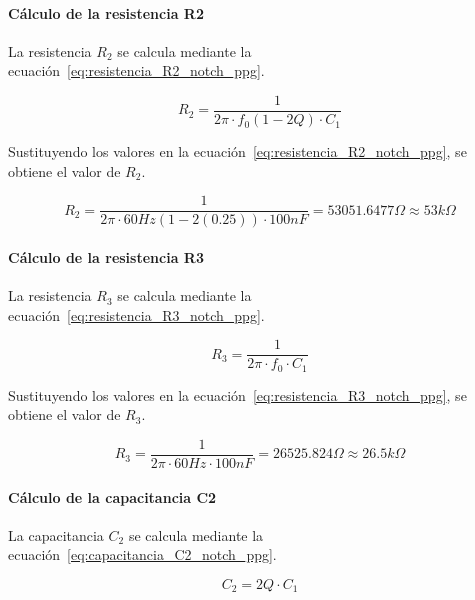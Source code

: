         \paragraph{Cálculo de la resistencia R2}
        La resistencia $R_2$ se calcula mediante la ecuación~\ref{eq:resistencia_R2_notch_ppg}.

        \begin{equation}
            \label{eq:resistencia_R2_notch_ppg}
            R_2 = \frac{1}{2\pi \cdot f_0 (1 - 2Q) \cdot C_1}
        \end{equation}

        Sustituyendo los valores en la ecuación~\ref{eq:resistencia_R2_notch_ppg}, se obtiene el valor de $R_2$.

        \begin{equation}
            R_2 = \frac{1}{2\pi \cdot 60 Hz(1 - 2(0.25)) \cdot 100 nF} = 53051.6477 \Omega \approx 53 k\Omega
        \end{equation}

        \paragraph{Cálculo de la resistencia R3}
        La resistencia $R_3$ se calcula mediante la ecuación~\ref{eq:resistencia_R3_notch_ppg}.

        \begin{equation}
            \label{eq:resistencia_R3_notch_ppg}
            R_3 = \frac{1}{2\pi \cdot f_0 \cdot C_1}
        \end{equation}

        Sustituyendo los valores en la ecuación~\ref{eq:resistencia_R3_notch_ppg}, se obtiene el valor de $R_3$.

        \begin{equation}
            R_3 = \frac{1}{2\pi \cdot 60 Hz \cdot 100 nF} = 26525.824 \Omega \approx 26.5 k\Omega
        \end{equation}

        \paragraph{Cálculo de la capacitancia C2}
        La capacitancia $C_2$ se calcula mediante la ecuación~\ref{eq:capacitancia_C2_notch_ppg}.

        \begin{equation}
            \label{eq:capacitancia_C2_notch_ppg}
            C_2 = 2Q \cdot C_1
        \end{equation}

